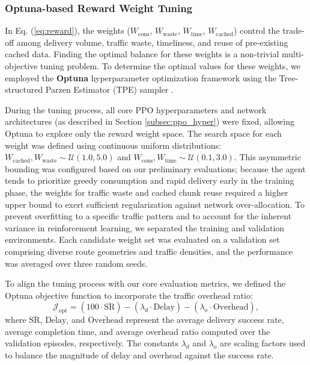 \subsubsection{Optuna-based Reward Weight Tuning}
\label{subsubsec:optuna_weights}
In Eq. (\ref{eq:reward}), the weights ($W_{\text{cons}}$, $W_{\text{waste}}$, $W_{\text{time}}$, $W_{\text{cached}}$) control the trade-off among delivery volume, traffic waste, timeliness, and reuse of pre-existing cached data. Finding the optimal balance for these weights is a non-trivial multi-objective tuning problem. To determine the optimal values for these weights, we employed the \textbf{Optuna} hyperparameter optimization framework using the Tree-structured Parzen Estimator (TPE) sampler \cite{Optuna}.

During the tuning process, all core PPO hyperparameters and network architectures (as described in Section \ref{subsec:ppo_hyper}) were fixed, allowing Optuna to explore only the reward weight space. The search space for each weight was defined using continuous uniform distributions: $W_{\text{cached}}, W_{\text{waste}} \sim \mathcal{U}(1.0, 5.0)$ and $W_{\text{cons}}, W_{\text{time}} \sim \mathcal{U}(0.1, 3.0)$. This asymmetric bounding was configured based on our preliminary evaluations; because the agent tends to prioritize greedy consumption and rapid delivery early in the training phase, the weights for traffic waste and cached chunk reuse required a higher upper bound to exert sufficient regularization against network over-allocation. To prevent overfitting to a specific traffic pattern and to account for the inherent variance in reinforcement learning, we separated the training and validation environments. Each candidate weight set was evaluated on a validation set comprising diverse route geometries and traffic densities, and the performance was averaged over three random seeds.

To align the tuning process with our core evaluation metrics, we defined the Optuna objective function to incorporate the traffic overhead ratio:
\begin{equation}
\mathcal{J}_{\text{opt}} = (100 \cdot \overline{\text{SR}}) - (\lambda_d \cdot \overline{\text{Delay}}) - (\lambda_o \cdot \overline{\text{Overhead}}),
\end{equation}
where $\overline{\text{SR}}$, $\overline{\text{Delay}}$, and $\overline{\text{Overhead}}$ represent the average delivery success rate, average completion time, and average overhead ratio computed over the validation episodes, respectively. The constants $\lambda_d$ and $\lambda_o$ are scaling factors used to balance the magnitude of delay and overhead against the success rate.

